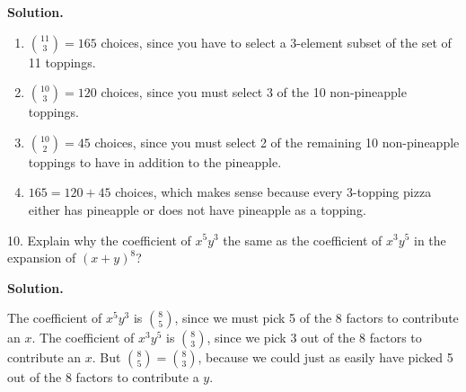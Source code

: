 \documentclass[10pt,]{book}
\theoremstyle{plain}
\theoremstyle{definition}
\theoremstyle{definition}
\theoremstyle{definition}
\numberwithin{equation}{section}
\begin{document}
\begin{exerciselist}
\noindent\textbf{Solution.}\hypertarget{solution-84}{}\quad
\leavevmode%
\begin{enumerate}[label=(\alph*)]
\item\hypertarget{li-454}{}\({11 \choose 3} = 165\) choices, since you have to select a 3-element subset of the set of 11 toppings.%
\item\hypertarget{li-455}{}\({10 \choose 3} = 120\) choices, since you must select 3 of the 10 non-pineapple toppings.%
\item\hypertarget{li-456}{}\({10 \choose 2} = 45\) choices, since you must select 2 of the remaining 10 non-pineapple toppings to have in addition to the pineapple.%
\item\hypertarget{li-457}{}\(165  = 120 + 45\) choices, which makes sense because every 3-topping pizza either has pineapple or does not have pineapple as a topping.%
\end{enumerate}
\item[10.]\hypertarget{exercise-59}{}
            Explain why the coefficient of \(x^5y^3\) the same as the coefficient of \(x^3y^5\) in the expansion of \((x+y)^8\)?
\par\smallskip
\par\smallskip
\noindent\textbf{Solution.}\hypertarget{solution-85}{}\quad

            The coefficient of \(x^5y^3\) is \({8\choose 5}\), since we must pick 5 of the 8 factors to contribute an \(x\). The coefficient of \(x^3y^5\) is \({8 \choose 3}\), since we pick 3 out of the 8 factors to contribute an \(x\). But \({8 \choose 5} = {8\choose 3}\), because we could just as easily have picked 5 out of the 8 factors to contribute a \(y\).
\end{exerciselist}
\typeout{************************************************}
\typeout{************************************************}
\end{document}
